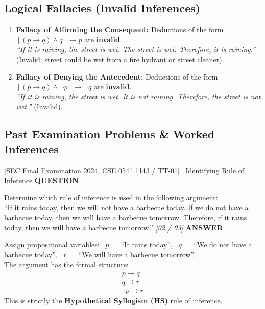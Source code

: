 \documentclass[11pt,a4paper]{article}
\newcommand{\Qlabel}{\textbf{\color{navy}\footnotesize\MakeUppercase{Question}}\par\smallskip}
\newcommand{\Alabel}{\textbf{\color{teal}\footnotesize\MakeUppercase{Answer}}\par\smallskip}
\begin{document}
\subsection{Logical Fallacies (Invalid Inferences)}
\begin{warningbox}
\begin{enumerate}
    \item \textbf{Fallacy of Affirming the Consequent:} Deductions of the form $[(p \rightarrow q) \wedge q] \rightarrow p$ are \textbf{invalid}.\\
    \textit{``If it is raining, the street is wet. The street is wet. Therefore, it is raining.''} (Invalid: street could be wet from a fire hydrant or street cleaner).
    \item \textbf{Fallacy of Denying the Antecedent:} Deductions of the form $[(p \rightarrow q) \wedge \neg p] \rightarrow \neg q$ are \textbf{invalid}.\\
    \textit{``If it is raining, the street is wet. It is not raining. Therefore, the street is not wet.''} (Invalid).
\end{enumerate}
\end{warningbox}

\subsection{Past Examination Problems \& Worked Inferences}

\begin{exambox}{[SEC Final Examination 2024, CSE 0541 1143 / TT-01] \ Identifying Rule of Inference}
\Qlabel
Determine which rule of inference is used in the following argument:\\
``If it rains today, then we will not have a barbecue today. If we do not have a barbecue today, then we will have a barbecue tomorrow. Therefore, if it rains today, then we will have a barbecue tomorrow.'' \hfill\textit{[02 / 03]}
\tcblower
\Alabel
Assign propositional variables: \ $p =$ ``It rains today'', \ $q =$ ``We do not have a barbecue today'', \ $r =$ ``We will have a barbecue tomorrow''.\\
The argument has the formal structure:
\[
\begin{array}{l}
p \rightarrow q \\
q \rightarrow r \\
\hline
\therefore p \rightarrow r
\end{array}
\]
This is strictly the \textbf{Hypothetical Syllogism (HS)} rule of inference.
\end{exambox}
\end{document}
